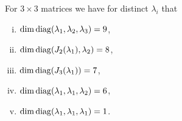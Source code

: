 \documentclass{article}
\begin{document}
For $3\times3$ matrices we have for distinct $\lambda_i$ that 
\begin{enumerate}[(i)]
	\item $\dim\operatorname{diag}(\lambda_1,\lambda_2,\lambda_3)=9$,
	\item $\dim\operatorname{diag}( J_2(\lambda_1), \lambda_2)=8$, 
	\item $\dim\operatorname{diag}( J_3(\lambda_1))=7$,
	\item $\dim\operatorname{diag}(\lambda_1,\lambda_1,\lambda_2)=6$,
	\item $\dim\operatorname{diag}(\lambda_1,\lambda_1,\lambda_1)=1$.
\end{enumerate}




\end{document}
